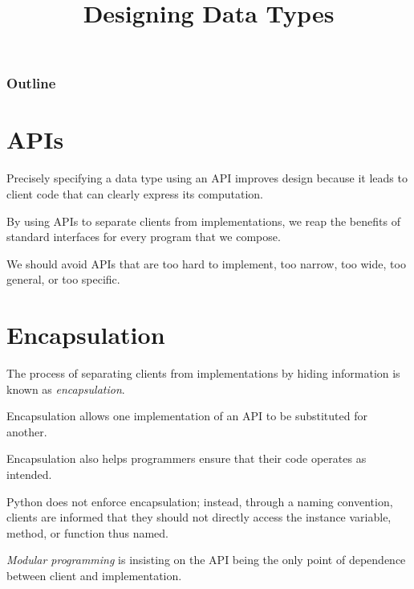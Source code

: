 \documentclass[8pt,a4paper,compress,handout]{beamer}
\title{Designing Data Types}
\date{}
\begin{document}
\begin{frame}
\vfill
\titlepage
\end{frame}

\begin{frame}
\frametitle{Outline}
\tableofcontents
\end{frame}

\section{APIs}
\begin{frame}[fragile]
Precisely specifying a data type using an API improves design because it leads to client code that can clearly express its computation. 

\bigskip

By using APIs to separate clients from implementations, we reap the benefits of standard interfaces for every program that we compose.

\bigskip

We should avoid APIs that are too hard to implement, too narrow, too wide, too general, or too specific.
\end{frame}

\section{Encapsulation}
\begin{frame}[fragile]
The process of separating clients from implementations by hiding information is known as \emph{encapsulation}.

\bigskip

Encapsulation allows one implementation of an API to be substituted for another.

\bigskip

Encapsulation also helps programmers ensure that their code operates as intended.

\bigskip

Python does not enforce encapsulation; instead, through a naming convention, clients are informed that they should not directly access the instance variable, method, or function thus named.

\bigskip

\emph{Modular programming} is insisting on the API being the only point of dependence between client and implementation.
\end{frame}
\end{document}
